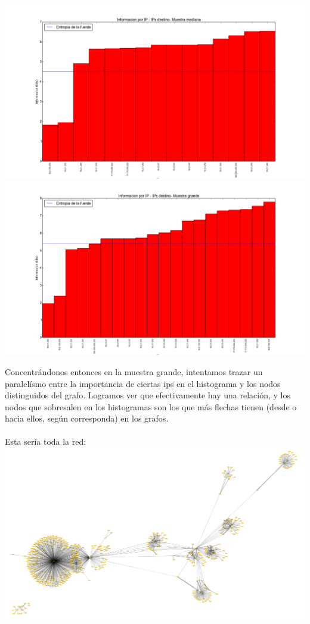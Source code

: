 \includegraphics[scale=0.5,clip=true,trim=100 0 0 0]{graphics/facultad_mediana_dst.png}
\includegraphics[scale=0.5,clip=true,trim=100 0 0 0]{graphics/facultad_grande_dst.png}

\indent Concentrándonos entonces en la muestra grande, intentamos trazar un paralelísmo entre la importancia de ciertas ips en el histograma y los nodos distinguidos del grafo. Logramos ver que efectivamente hay una relación, y los nodos que sobresalen en los histogramas son los que más flechas tienen (desde o hacia ellos, según corresponda) en los grafos.\\
\\
\indent Esta sería toda la red:\\
\includegraphics[scale=0.5,clip=true,trim=140 0 0 0]{graphics/toda_la_red.png}

